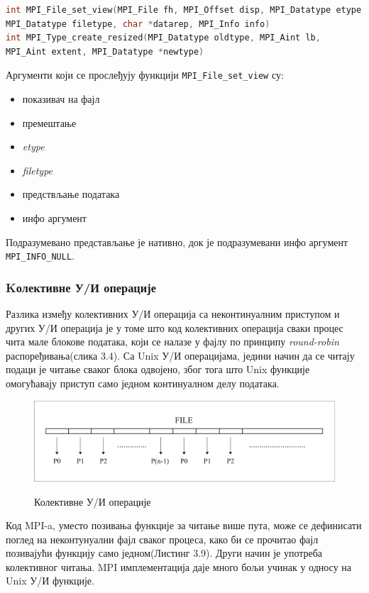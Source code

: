 \begin{lstlisting}[style=nonumbers,frame=single, language=C, caption= MPI функције]
int MPI_File_set_view(MPI_File fh, MPI_Offset disp, MPI_Datatype etype,
MPI_Datatype filetype, char *datarep, MPI_Info info)
int MPI_Type_create_resized(MPI_Datatype oldtype, MPI_Aint lb,
MPI_Aint extent, MPI_Datatype *newtype)
\end{lstlisting}

Аргументи који се прослеђују функцији \texttt{MPI\_File\_set\_view} су:
\begin{itemize}
	\item показивач на фајл
	\item премештање
	\item \textit{etype}
	\item \textit{filetype}
	\item предствљање података
	\item инфо аргумент
\end{itemize}
Подразумевано представљање је нативно, док је подразумевани инфо аргумент \texttt{MPI\_INFO\_NULL}.

\subsubsection{Kолективне У/И операције}

Разлика између колективних У/И операција са неконтинуалним приступом и других У/И операција је у томе што код колективних операција сваки процес чита мале блокове података, који се налазе у фајлу по принципу \textit{round-robin} распоређивања(слика 3.4). Са Unix У/И операцијама, једини начин да се читају подаци је читање сваког блока одвојено, због тога што Unix функције омогућавају приступ само једном континуалном делу података. 

\begin{figure}[h!]
  \centering
      \includegraphics[width=1\textwidth]{slike/block-cyclic.png}\\[1cm]
  \caption{Колективне У/И операције}
\end{figure}

Код MPI-a, уместо позивања функције за читање више пута, може се дефинисати поглед на неконтунуални фајл сваког процеса, како би се прочитао фајл позивајући функцију само једном(Листинг 3.9). Други начин је употреба колективног читања. MPI имплементација даје много бољи учинак у односу на Unix У/И функције.

